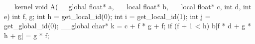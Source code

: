 __kernel void A(__global float* a, __local float* b, __local float* c, int d, int e) {
  int f, g;
  int h = get_local_id(0);
  int i = get_local_id(1);
  int j = get_global_id(0);
  __global char* k = c + f * g + f;
  if (f + 1 < h)
    b[f * d + g * h + g] = g * f;
}
